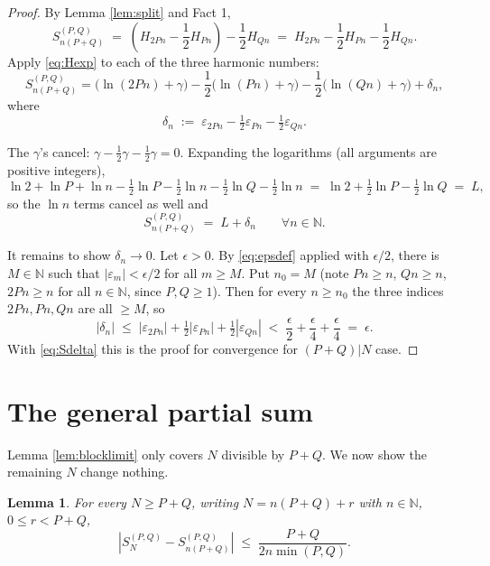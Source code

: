\documentclass[11pt]{article}
\newtheorem{lemma}{Lemma}
\begin{document}
\begin{proof}
By Lemma \ref{lem:split} and Fact 1,
\[
S_{n(P+Q)}^{(P,Q)}
\;=\; \left( H_{2Pn} - \frac{1}{2} H_{Pn} \right) - \frac{1}{2} H_{Qn}
\;=\; H_{2Pn} - \frac{1}{2} H_{Pn} - \frac{1}{2} H_{Qn}.
\]
Apply \eqref{eq:Hexp} to each of the three harmonic numbers:
\[
S_{n(P+Q)}^{(P,Q)}
= \bigl( \ln(2Pn) + \gamma \bigr)
- \frac{1}{2}\bigl( \ln(Pn) + \gamma \bigr)
- \frac{1}{2}\bigl( \ln(Qn) + \gamma \bigr)
+ \delta_n ,
\]
where
\[
\delta_n \;:=\; \varepsilon_{2Pn} - \tfrac{1}{2}\varepsilon_{Pn} - \tfrac{1}{2}\varepsilon_{Qn}.
\]

The $\gamma$'s cancel: $\gamma - \frac{1}{2}\gamma - \frac{1}{2}\gamma = 0$. Expanding the
logarithms (all arguments are positive integers),
\[
\ln 2 + \ln P + \ln n
- \tfrac{1}{2}\ln P - \tfrac{1}{2}\ln n
- \tfrac{1}{2}\ln Q - \tfrac{1}{2}\ln n
\;=\; \ln 2 + \tfrac{1}{2}\ln P - \tfrac{1}{2}\ln Q \;=\; L ,
\]
so the $\ln n$ terms cancel as well and
\begin{equation}\label{eq:Sdelta}
S_{n(P+Q)}^{(P,Q)} \;=\; L + \delta_n \qquad \forall n \in \mathbb{N}.
\end{equation}

It remains to show $\delta_n \to 0$. Let $\epsilon > 0$. By \eqref{eq:epsdef} applied
with $\epsilon/2$, there is $M \in \mathbb{N}$ such that $|\varepsilon_m| < \epsilon/2$
for all $m \ge M$. Put $n_0 = M$ (note $Pn \ge n$, $Qn \ge n$, $2Pn \ge n$ for all
$n \in \mathbb{N}$, since $P, Q \ge 1$). Then for every $n \ge n_0$ the three indices
$2Pn, Pn, Qn$ are all $\ge M$, so
\[
\left| \delta_n \right|
\;\le\; \left| \varepsilon_{2Pn} \right| + \tfrac{1}{2}\left| \varepsilon_{Pn} \right|
+ \tfrac{1}{2}\left| \varepsilon_{Qn} \right|
\;<\; \frac{\epsilon}{2} + \frac{\epsilon}{4} + \frac{\epsilon}{4} \;=\; \epsilon .
\]
With \eqref{eq:Sdelta} this is the proof for convergence for $(P+Q) | N$ case.
\end{proof}


\section{The general partial sum}

Lemma \ref{lem:blocklimit} only covers $N$ divisible by $P+Q$. We now show the remaining
$N$ change nothing.

\begin{lemma}\label{lem:tail}
For every $N \ge P+Q$, writing $N = n(P+Q) + r$ with $n \in \mathbb{N}$,
$0 \le r < P+Q$,
\[
\left| S_N^{(P,Q)} - S_{n(P+Q)}^{(P,Q)} \right| \;\le\; \frac{P+Q}{2n \min(P,Q)} .
\]
\end{lemma}
\end{document}
